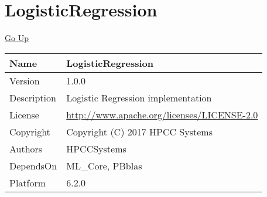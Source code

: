 \chapter*{\color{headtoc} LogisticRegression}
\hypertarget{ecldoc:toc:root/LogisticRegression}{}
\hyperlink{ecldoc:toc:root}{Go Up}

\begin{tabularx}{\textwidth}{|l|X|}
\hline
Name &
LogisticRegression
 \\
\hline
Version &
1.0.0
 \\
\hline
Description &
Logistic Regression implementation
 \\
\hline
License &
\url{http://www.apache.org/licenses/LICENSE-2.0}
 \\
\hline
Copyright &
Copyright (C) 2017 HPCC Systems
 \\
\hline
Authors &
HPCCSystems
 \\
\hline
DependsOn &
ML\_Core, PBblas
 \\
\hline
Platform &
6.2.0
 \\
\hline
\end{tabularx}

